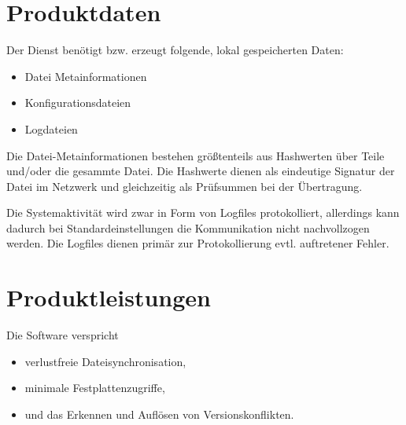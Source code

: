 \documentclass[12pt,oneside,a4paper,bibtotoc,liststotoc,pointlessnumbers]{scrartcl}
\begin{document}
\newpage
\section{Produktdaten}
Der Dienst benötigt bzw. erzeugt folgende, lokal gespeicherten Daten:
\begin{itemize}
    \item Datei Metainformationen
    \item Konfigurationsdateien
    \item Logdateien 
\end{itemize}
Die Datei-Metainformationen bestehen größtenteils aus Hashwerten über Teile und/oder die gesammte Datei.
Die Hashwerte dienen als eindeutige Signatur der Datei im Netzwerk und gleichzeitig als Prüfsummen bei der
Übertragung.


Die Systemaktivität wird zwar in Form von Logfiles protokolliert, allerdings kann dadurch
bei Standardeinstellungen die Kommunikation nicht nachvollzogen werden. Die Logfiles dienen
primär zur Protokollierung evtl. auftretener Fehler.
\section{Produktleistungen}
Die Software verspricht
\begin{itemize}
    \item verlustfreie Dateisynchronisation,
    \item minimale Festplattenzugriffe,
    \item und das Erkennen und Auflösen von Versionskonflikten.
\end{itemize}
\newpage
\end{document}

